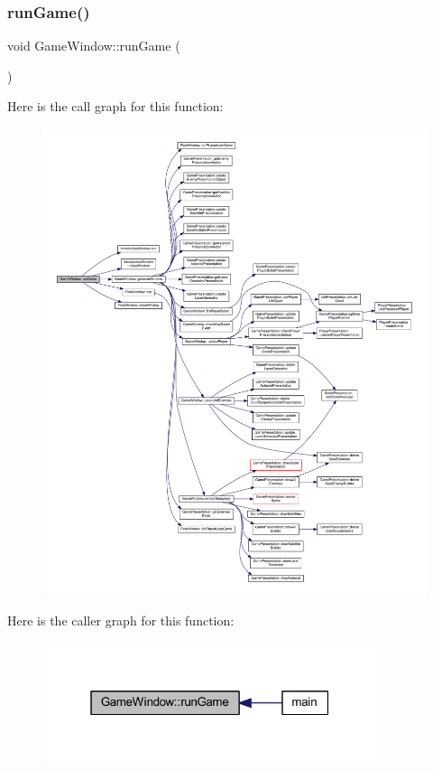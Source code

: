 \subsubsection{\texorpdfstring{run\+Game()}{runGame()}}
{\footnotesize\ttfamily void Game\+Window\+::run\+Game (\begin{DoxyParamCaption}{ }\end{DoxyParamCaption})}

Here is the call graph for this function\+:\nopagebreak
\begin{figure}[H]
\begin{center}
\leavevmode
\includegraphics[width=350pt]{class_game_window_aa4188b605313be96d69cf32d3f143987_cgraph}
\end{center}
\end{figure}
Here is the caller graph for this function\+:\nopagebreak
\begin{figure}[H]
\begin{center}
\leavevmode
\includegraphics[width=277pt]{class_game_window_aa4188b605313be96d69cf32d3f143987_icgraph}
\end{center}
\end{figure}
\mbox{\label{class_game_window_a62ed57d80a4eb7945777f5d383747bdf}} 
